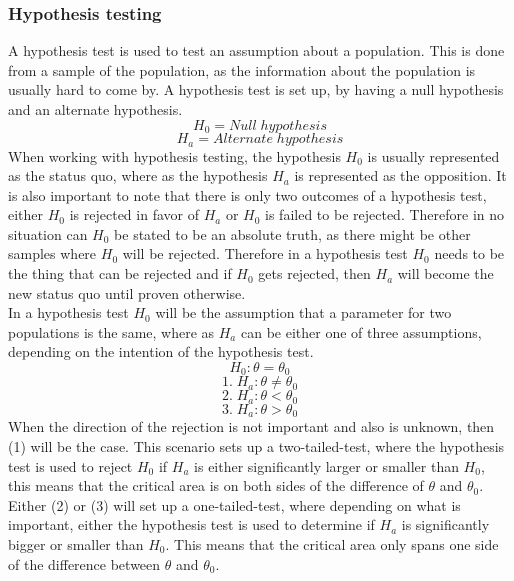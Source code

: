 \subsubsection{Hypothesis testing}
A hypothesis test is used to test an assumption about a population. This is done from a sample of the population, as the information about the population is usually hard to come by. A hypothesis test is set up, by having a null hypothesis and an alternate hypothesis.
$$H_0 = Null\; hypothesis$$
$$H_a = Alternate\; hypothesis$$
When working with hypothesis testing, the hypothesis $H_0$ is usually represented as the status quo, where as the hypothesis $H_a$ is represented as the opposition. It is also important to note that there is only two outcomes of a hypothesis test, either $H_0$ is rejected in favor of $H_a$ or $H_0$ is failed to be rejected. Therefore in no situation can $H_0$ be stated to be an absolute truth, as there might be other samples where $H_0$ will be rejected. Therefore in a hypothesis test $H_0$ needs to be the thing that can be rejected and if $H_0$ gets rejected, then $H_a$ will become the new status quo until proven otherwise.\\
In a hypothesis test $H_0$ will be the assumption that a parameter for two populations is the same, where as $H_a$ can be either one of three assumptions, depending on the intention of the hypothesis test.
$$H_0: \theta = \theta_0$$
$$1.\;H_a: \theta \neq \theta_0$$
$$2.\;H_a: \theta < \theta_0$$
$$3.\;H_a: \theta > \theta_0$$
When the direction of the rejection is not important and also is unknown, then (1) will be the case. This scenario sets up a two-tailed-test, where the hypothesis test is used to reject $H_0$ if $H_a$ is either significantly larger or smaller than $H_0$, this means that the critical area is on both sides of the difference of $\theta$ and $\theta_0$. Either (2) or (3) will set up a one-tailed-test, where depending on what is important, either the hypothesis test is used to determine if $H_a$ is significantly bigger or smaller than $H_0$. This means that the critical area only spans one side of the difference between $\theta$ and $\theta_0$.\\

